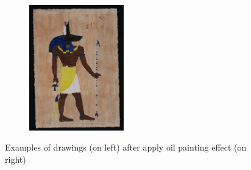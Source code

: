 \begin{figure}
\begin{subfigure}[b]{0.5\textwidth}
         \includegraphics[width=0.45\textwidth]{images/style_augments/2019_14-17_0188_RUS_R_C_oil.jpg}
         \caption{}
     \end{subfigure}
     \caption{Examples of drawings (on left) after apply oil painting effect (on right)}
     \label{fig:oil-style-effects}
\end{figure}


